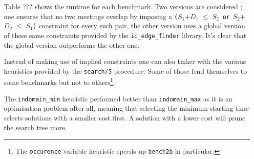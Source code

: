 Table ??? shows the runtime for each benchmark. Two versions are considered ; one ensures that no two meetings overlap by imposing a \texttt{(}$S_1$+$D_1$ $\leq$ $S_2$\ \texttt{or}\ $S_2$+$D_2$ $\leq$ $S_1$\texttt{)} constraint for every such pair, the other version uses a global version of these same constraints provided by the \texttt{ic\_edge\_finder} library. It's clear that the global version outperforms the other one.\\\par

Instead of making use of implied constraints one can also tinker with the various heuristics provided by the \texttt{search/5} procedure. Some of those lend themselves to some benchmarks but not to others\footnote{The \texttt{occurence} variable heuristic speeds up \texttt{bench2b} in particular.}.\par
The \texttt{indomain\_min} heuristic performed better than \texttt{indomain\_max} as it is an optimisation problem after all, meaning that selecting the minimum starting time selects solutions with a smaller cost first. A solution with a lower cost will prune the search tree more.